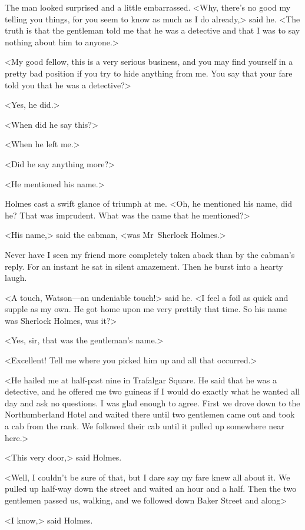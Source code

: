 The man looked surprised and a little embarrassed. <Why, there's no good my telling you things, for you seem to know as much as I do already,> said he. <The truth is that the gentleman told me that he was a detective and that I was to say nothing about him to anyone.>

<My good fellow, this is a very serious business, and you may find yourself in a pretty bad position if you try to hide anything from me. You say that your fare told you that he was a detective?>

<Yes, he did.>

<When did he say this?>

<When he left me.>

<Did he say anything more?>

<He mentioned his name.>


Holmes cast a swift glance of triumph at me. <Oh, he mentioned his name, did he? That was imprudent. What was the name that he mentioned?>

<His name,> said the cabman, <was Mr~Sherlock Holmes.>

Never have I seen my friend more completely taken aback than by the cabman's reply. For an instant he sat in silent amazement. Then he burst into a hearty laugh.

<A touch, Watson—an undeniable touch!> said he. <I feel a foil as quick and supple as my own. He got home upon me very prettily that time. So his name was Sherlock Holmes, was it?>

<Yes, sir, that was the gentleman's name.>

<Excellent! Tell me where you picked him up and all that occurred.>

<He hailed me at half-past nine in Trafalgar Square. He said that he was a detective, and he offered me two guineas if I would do exactly what he wanted all day and ask no questions. I was glad enough to agree. First we drove down to the Northumberland Hotel and waited there until two gentlemen came out and took a cab from the rank. We followed their cab until it pulled up somewhere near here.>

<This very door,> said Holmes.

<Well, I couldn't be sure of that, but I dare say my fare knew all about it. We pulled up half-way down the street and waited an hour and a half. Then the two gentlemen passed us, walking, and we followed down Baker Street and along\longdash>

<I know,> said Holmes.


